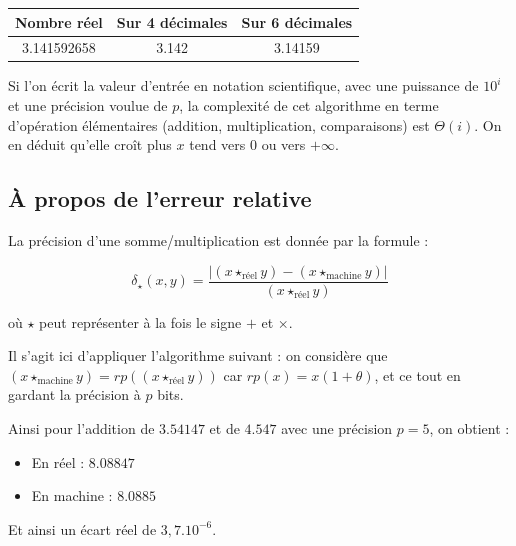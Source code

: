\documentclass{article}
\begin{document}
\begin{center}
    \begin{tabular}{|c|c|c|}
      \hline
      \textbf{Nombre réel} & \textbf{Sur 4 décimales} & \textbf{Sur 6 décimales} \\
      \hline
      3.141592658 & 3.142 & 3.14159\\
      \hline
    \end{tabular}  
\end{center}

Si l'on écrit la valeur d'entrée en notation scientifique, avec une puissance de $10^i$ et une précision voulue de $p$, la complexité de cet algorithme en terme d'opération élémentaires (addition, multiplication, comparaisons) est $\Theta (i)$. On en déduit qu'elle croît plus $x$ tend vers $0$ ou vers $+\infty$.

\subsection{À propos de l'erreur relative}

La précision d'une somme/multiplication est donnée par la formule :

\[\boxed{\delta_\star (x,y) = \frac{|(x\star_\text{réel}y)-(x\star_\text{machine}y)|}{(x\star_\text{réel}y)}}\] 

où $\star$ peut représenter à la fois le signe $+$ et $\times$.

Il s'agit ici d'appliquer l'algorithme suivant : on considère que $(x\star_\text{machine}y) = rp( (x\star_\text{réel}y))$ car $rp(x) = x(1 + \theta)$, et ce tout en gardant la précision à $p$ bits.

Ainsi pour l'addition de $3.54147$ et de $4.547$ avec une précision $p = 5$, on obtient :

\begin{itemize}
    \item En réel : $8.08847$
    \item En machine : $8.0885$
\end{itemize}
Et ainsi un écart réel de $3,7.10^{-6}$.
\end{document}

